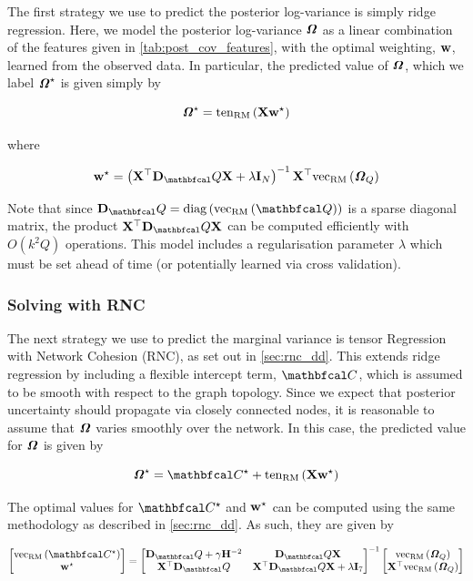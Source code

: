 \label{sec:logvar_RR}

The first strategy we use to predict the posterior log-variance is simply ridge regression. Here, we model the posterior log-variance $\bm{\mathit{\Omega}}$ as a linear combination of the features given in \cref{tab:post_cov_features}, with the optimal weighting, $\mathbf{w}$, learned from the observed data. In particular, the predicted value of $\bm{\mathit{\Omega}}$, which we label $\bm{\mathit{\Omega}}^\star$ is given simply by 

$$
\bm{\mathit{\Omega}}^\star = \text{\textup{ten}}_{\text{\textup{RM}}}\left(\mathbf{X} \mathbf{w}^\star\right)
$$

where 

$$
\w^\star = \left(\X^\top \D_\Qt \X + \lambda \I_N\right)^{-1} \X^\top  \vecrm{\Omegat_Q}
$$

Note that since $\D_\Qt = \diag{\vecrm{\Qt}}$ is a sparse diagonal matrix, the product $\X^\top \D_\Qt \X$ can be computed efficiently with $O(k^2Q)$ operations. This model includes a regularisation parameter $\lambda$ which must be set ahead of time (or potentially learned via cross validation).


\subsubsection{Solving with RNC}

\label{sec:logvar_RNC}

The next strategy we use to predict the marginal variance is tensor Regression with Network Cohesion (RNC), as set out in \cref{sec:rnc_dd}. This extends ridge regression by including a flexible intercept term, $\Ct$, which is assumed to be smooth with respect to the graph topology. Since we expect that posterior uncertainty should propagate via closely connected nodes, it is reasonable to assume that $\bm{\mathit{\Omega}}$ varies smoothly over the network. In this case, the predicted value for $\bm{\mathit{\Omega}}$ is given by 


\begin{equation}
    \Omegat^\star = \Ct^\star + \tenrm{\X \w^\star}
\end{equation}

The optimal values for $\Ct^\star$ and $\mathbf{w}^\star$ can be computed using the same methodology as described in \cref{sec:rnc_dd}. As such, they are given by

\begin{equation}
    \begin{bmatrix}
        \vecrm{\Ct^\star} \\ \w^\star 
    \end{bmatrix} = \begin{bmatrix}
        \D_\Qt + \gamma \HH^{-2} & \D_\Qt \X \\
        \X^\top \D_\Qt & \X^\top \D_\Qt \X + \lambda \I_7
    \end{bmatrix}^{-1} \begin{bmatrix}
        \vecrm{\Omegat_Q} \\ \X^\top \vecrm{\Omegat_Q}
    \end{bmatrix}
\end{equation} 


